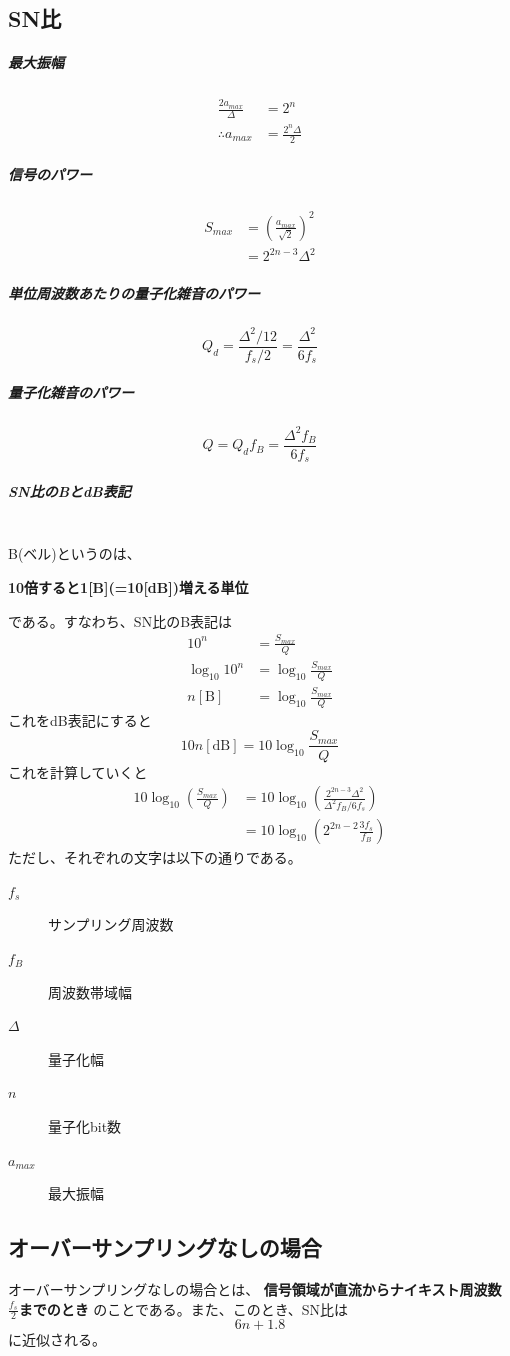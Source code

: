 \documentclass[twocolumn]{ltjsarticle}
\begin{document}
\subsection{SN比}
\subparagraph{最大振幅}
\begin{align*}
\frac{2a_{max}}{\Delta}&=2^n\\
\therefore a_{max}&=\frac{2^n\Delta}{2}
\end{align*}
\subparagraph{信号のパワー}
\begin{align*}
S_{max}&=(\frac{a_{max}}{\sqrt{2}})^2\\
&=2^{2n-3}\Delta^2
\end{align*}
\subparagraph{単位周波数あたりの量子化雑音のパワー}
$$Q_d=\frac{\Delta^2/12}{f_s/2}=\frac{\Delta^2}{6f_s}$$
\subparagraph{量子化雑音のパワー}
$$Q=Q_df_B=\frac{\Delta^2f_B}{6f_s}$$
\subparagraph{SN比のBとdB表記}\leavevmode\\
B(ベル)というのは、\\
\centerline{\textbf{10倍すると1[B](=10[dB])増える単位}}
である。すなわち、SN比のB表記は
\begin{align*}
10^n&=\frac{S_{max}}{Q}\\
\log_{10}10^n&=\log_10\frac{S_{max}}{Q}\\
n[\mathrm{B}]&=\log_{10}\frac{S_{max}}{Q}
\end{align*}
これをdB表記にすると
$$10n[\mathrm{dB}]=10\log_{10}\frac{S_{max}}{Q}$$
これを計算していくと
\begin{align*}
10\log_{10}(\frac{S_{max}}{Q})
&=10\log_{10}(\frac{2^{2n-3}\Delta^2}{\Delta^2f_B/6f_s})\\
&=10\log_{10}(2^{2n-2}\frac{3f_s}{f_B})
\end{align*}
ただし、それぞれの文字は以下の通りである。
\begin{description}
    \item[$f_s$]サンプリング周波数
    \item[$f_B$]周波数帯域幅
    \item[$\Delta$]量子化幅
    \item[$n$]量子化bit数
    \item[$a_{max}$]最大振幅     
\end{description}
\subsection{オーバーサンプリングなしの場合}
オーバーサンプリングなしの場合とは、
\textbf{信号領域が直流からナイキスト周波数$\frac{f_s}{2}$までのとき}
のことである。また、このとき、SN比は
$$6n+1.8$$に近似される。
\end{document}
